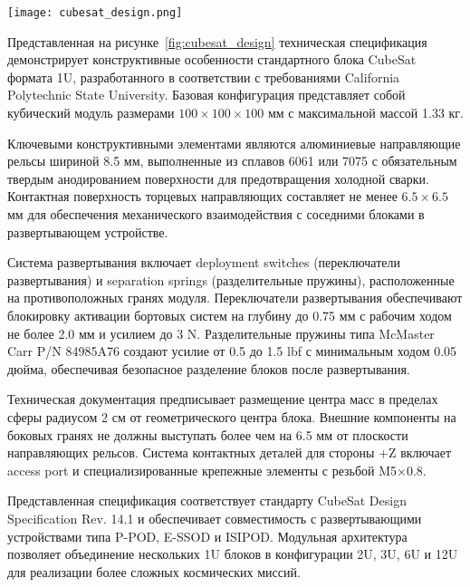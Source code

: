 
\begin{sidewaysfigure}[htbp]
	\centering
	\texttt{[image: cubesat\_design.png]}
	\caption{Спецификация спутника типа CubeSat}
	\label{fig:cubesat_design}
\end{sidewaysfigure}

Представленная на рисунке~\ref{fig:cubesat_design} техническая спецификация демонстрирует конструктивные особенности стандартного блока CubeSat формата 1U, разработанного в соответствии с требованиями California Polytechnic State University. Базовая конфигурация представляет собой кубический модуль размерами \(100 \times 100 \times 100\) мм с максимальной массой 1.33 кг.

Ключевыми конструктивными элементами являются алюминиевые направляющие рельсы шириной 8.5 мм, выполненные из сплавов 6061 или 7075 с обязательным твердым анодированием поверхности для предотвращения холодной сварки. Контактная поверхность торцевых направляющих составляет не менее \(6.5 \times 6.5\) мм для обеспечения механического взаимодействия с соседними блоками в развертывающем устройстве.

Система развертывания включает deployment switches (переключатели развертывания) и separation springs (разделительные пружины), расположенные на противоположных гранях модуля. Переключатели развертывания обеспечивают блокировку активации бортовых систем на глубину до 0.75 мм с рабочим ходом не более 2.0 мм и усилием до 3 N. Разделительные пружины типа McMaster Carr P/N 84985A76 создают усилие от 0.5 до 1.5 lbf с минимальным ходом 0.05 дюйма, обеспечивая безопасное разделение блоков после развертывания.

Техническая документация предписывает размещение центра масс в пределах сферы радиусом 2 см от геометрического центра блока. Внешние компоненты на боковых гранях не должны выступать более чем на 6.5 мм от плоскости направляющих рельсов. Система контактных деталей для стороны +Z включает access port и специализированные крепежные элементы с резьбой M5×0.8.

Представленная спецификация соответствует стандарту CubeSat Design Specification Rev. 14.1 и обеспечивает совместимость с развертывающими устройствами типа P-POD, E-SSOD и ISIPOD. Модульная архитектура позволяет объединение нескольких 1U блоков в конфигурации 2U, 3U, 6U и 12U для реализации более сложных космических миссий.
